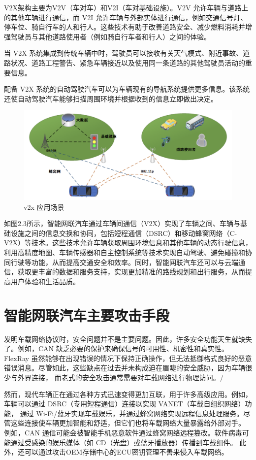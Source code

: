 V2X架构主要为V2V（车对车）和V2I（车对基础设施）。V2V 允许车辆与道路上的其他车辆进行通信，而 V2I 允许车辆与外部实体进行通信，例如交通信号灯、停车位、骑自行车的人和行人。这些技术有助于改善道路安全、减少燃料消耗并增强驾驶员与其他道路使用者（例如骑自行车者和行人）之间的体验。

当 V2X 系统集成到传统车辆中时，驾驶员可以接收有关天气模式、附近事故、道路状况、道路工程警告、紧急车辆接近以及使用同一条道路的其他驾驶员活动的重要信息。

配备 V2X 系统的自动驾驶汽车可以为车辆现有的导航系统提供更多信息。该系统还使自动驾驶汽车能够扫描周围环境并根据收到的信息立即做出决定。
\begin{figure}
    \centering
    \includegraphics[scale=0.6]{resources/img/i3.png}
    \caption{v2x 应用场景}
  \end{figure}
如图2.3所示，智能网联汽车通过车辆间通信（V2X）实现了车辆之间、车辆与基础设施之间的信息交换和协同，包括短程通信（DSRC）和移动蜂窝网络（C-V2X）等技术。这些技术允许车辆获取周围环境信息和其他车辆的动态行驶信息，利用高精度地图、车辆传感器和自主控制系统等技术实现自动驾驶、避免碰撞和协同行驶等功能，从而提高交通安全和效率。同时，智能网联汽车还可以与云端通信，获取更丰富的数据和服务支持，实现更加精准的路线规划和出行服务，从而提高用户体验和生活品质。
\section{智能网联汽车主要攻击手段}
发明车载网络协议时，安全问题并不是主要问题。因此，许多安全功能天生就缺失了。例如，CAN 缺乏必要的保护来确保信号的可用性、机密性和真实性\cite{woo2014practical}。
FlexRay 虽然能够在出现错误的情况下保持正确操作，但无法抵御格式良好的恶意错误消息\cite{kleberger2011security}。尽管如此，这些缺点在过去并未构成迫在眉睫的安全威胁，因为车辆很少与外界连接，
而老式的安全攻击通常需要对车载网络进行物理访问。/

然而，现代车辆正在通过各种方式迅速变得更加互联，用于许多高级应用。例如，车辆可以通过 DSRC（专用短程通信）连接以实现 VANET（车载自组织网络）功能，
通过 Wi-Fi/蓝牙实现车载娱乐，并通过蜂窝网络实现远程信息处理服务。尽管这些连接使车辆更加智能和舒适，但它们也将车载网络大量暴露给外部对手。
例如，CAN 通信可能会被智能手机恶意软件通过蜂窝网络远程篡改\cite{woo2014practical}。软件病毒可能通过受感染的娱乐媒体（如 CD（光盘）或蓝牙播放器）传播到车载组件。
此外，还可以通过攻击OEM存储中心的ECU密钥管理不善来侵入车载网络。

